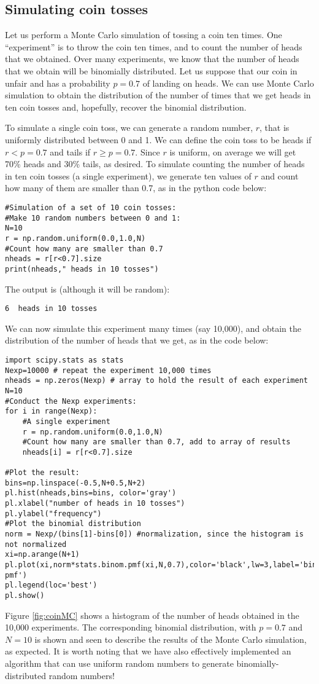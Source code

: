 \subsection{Simulating coin tosses}
Let us perform a Monte Carlo simulation of tossing a coin ten times. One ``experiment'' is to throw the coin ten times, and to count the number of heads that we obtained. Over many experiments, we know that the number of heads that we obtain will be binomially distributed. Let us suppose that our coin in unfair and has a probability $p=0.7$ of landing on heads. We can use Monte Carlo simulation to obtain the distribution of the number of times that we get heads in ten coin tosses and, hopefully, recover the binomial distribution.

To simulate a single coin toss, we can generate a random number, $r$, that is uniformly distributed between 0 and 1. We can define the coin toss to be heads if $r<p=0.7$ and tails if $r\geq p= 0.7$. Since $r$ is uniform, on average we will get 70\% heads and 30\% tails, as desired. To simulate counting the number of heads in ten coin tosses (a single experiment), we generate ten values of $r$ and count how many of them are smaller than 0.7, as in the python code below:
\begin{lstlisting}[frame=single] 
#Simulation of a set of 10 coin tosses:
#Make 10 random numbers between 0 and 1:
N=10
r = np.random.uniform(0.0,1.0,N)
#Count how many are smaller than 0.7
nheads = r[r<0.7].size
print(nheads," heads in 10 tosses")
\end{lstlisting}
The output is (although it will be random):
\begin{verbatim}
6  heads in 10 tosses
\end{verbatim}

We can now simulate this experiment many times (say 10,000), and obtain the distribution of the number of heads that we get, as in the code below:
\begin{lstlisting}[frame=single] 
import scipy.stats as stats
Nexp=10000 # repeat the experiment 10,000 times
nheads = np.zeros(Nexp) # array to hold the result of each experiment
N=10
#Conduct the Nexp experiments:
for i in range(Nexp):
    #A single experiment
    r = np.random.uniform(0.0,1.0,N)
    #Count how many are smaller than 0.7, add to array of results
    nheads[i] = r[r<0.7].size    
    
#Plot the result:
bins=np.linspace(-0.5,N+0.5,N+2)
pl.hist(nheads,bins=bins, color='gray')
pl.xlabel("number of heads in 10 tosses")
pl.ylabel("frequency")
#Plot the binomial distribution
norm = Nexp/(bins[1]-bins[0]) #normalization, since the histogram is not normalized
xi=np.arange(N+1)
pl.plot(xi,norm*stats.binom.pmf(xi,N,0.7),color='black',lw=3,label='binomial pmf')
pl.legend(loc='best')
pl.show()
\end{lstlisting}
Figure \ref{fig:coinMC} shows a histogram of the number of heads obtained in the 10,000 experiments. The corresponding binomial distribution, with $p=0.7$ and $N=10$ is shown and seen to describe the results of the Monte Carlo simulation, as expected. It is worth noting that we have also effectively implemented an algorithm that can use uniform random numbers to generate binomially-distributed random numbers!

